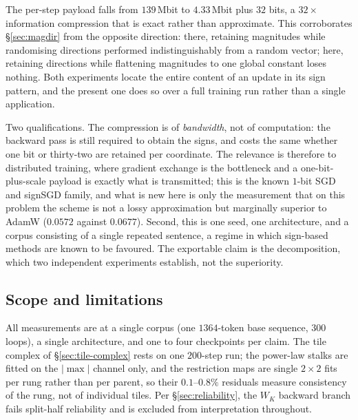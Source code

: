 The per-step payload falls from $139$\,Mbit to $4.33$\,Mbit plus $32$ bits, a
$32\times$ information compression that is exact rather than approximate. This
corroborates \S\ref{sec:magdir} from the opposite direction: there, retaining
magnitudes while randomising directions performed indistinguishably from a
random vector; here, retaining directions while flattening magnitudes to one
global constant loses nothing. Both experiments locate the entire content of an
update in its sign pattern, and the present one does so over a full training
run rather than a single application.

Two qualifications. The compression is of \emph{bandwidth}, not of computation:
the backward pass is still required to obtain the signs, and costs the same
whether one bit or thirty-two are retained per coordinate. The relevance is
therefore to distributed training, where gradient exchange is the bottleneck
and a one-bit-plus-scale payload is exactly what is transmitted; this is the
known $1$-bit SGD and signSGD family, and what is new here is only the
measurement that on this problem the scheme is not a lossy approximation but
marginally superior to AdamW ($0.0572$ against $0.0677$). Second, this is one
seed, one architecture, and a corpus consisting of a single repeated sentence,
a regime in which sign-based methods are known to be favoured. The exportable
claim is the decomposition, which two independent experiments establish, not
the superiority.

\subsection{Scope and limitations}

All measurements are at a single corpus (one $1364$-token base sequence,
$300$ loops), a single architecture, and one to four checkpoints per claim.
The tile complex of \S\ref{sec:tile-complex} rests on one $200$-step run; the
power-law stalks are fitted on the $|\max|$ channel only, and the restriction
maps are single $2\times2$ fits per rung rather than per parent, so their
$0.1$--$0.8\%$ residuals measure consistency of the rung, not of individual
tiles. Per \S\ref{sec:reliability}, the $W_K$ backward branch fails split-half
reliability and is excluded from interpretation throughout.

